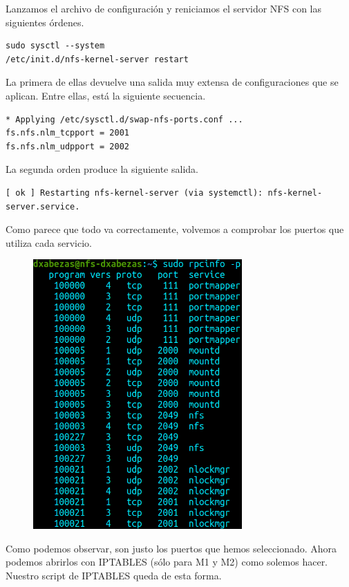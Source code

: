 \documentclass{article}
\begin{document}
Lanzamos el archivo de configuración y reniciamos el servidor NFS con las siguientes órdenes.
\begin{Verbatim}
sudo sysctl --system
/etc/init.d/nfs-kernel-server restart
\end{Verbatim}
La primera de ellas devuelve una salida muy extensa de configuraciones que se aplican. Entre ellas, está la siguiente secuencia.
\begin{Verbatim}
* Applying /etc/sysctl.d/swap-nfs-ports.conf ...
fs.nfs.nlm_tcpport = 2001
fs.nfs.nlm_udpport = 2002
\end{Verbatim}
La segunda orden produce la siguiente salida.
\begin{Verbatim}
[ ok ] Restarting nfs-kernel-server (via systemctl): nfs-kernel-server.service.
\end{Verbatim}

Como parece que todo va correctamente, volvemos a comprobar los puertos que utiliza cada servicio.

\begin{figure}[H]
	\centering
	\includegraphics[width=80mm]{imgs/rpcinfo2}
\end{figure}

Como podemos observar, son justo los puertos que hemos seleccionado. Ahora podemos abrirlos con IPTABLES (sólo para M1 y M2) como solemos hacer.
Nuestro script de IPTABLES queda de esta forma.
\end{document}
